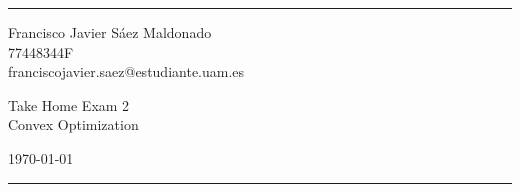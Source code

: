 \documentclass[a4paper]{article}
\begin{document}

\fancyhead[C]{}
\hrule \medskip %
\begin{minipage}{0.295\textwidth}
  \raggedright
  \footnotesize
  Francisco Javier Sáez Maldonado \hfill\\
  77448344F \hfill\\
  franciscojavier.saez@estudiante.uam.es
\end{minipage}
\begin{minipage}{0.4\textwidth}
  \centering
  \large
  Take Home Exam 2\\
  \normalsize
  Convex Optimization\\
\end{minipage}
\begin{minipage}{0.295\textwidth}
  \raggedleft
  \today\hfill\\
\end{minipage}
\medskip\hrule
\bigskip

\end{document}
